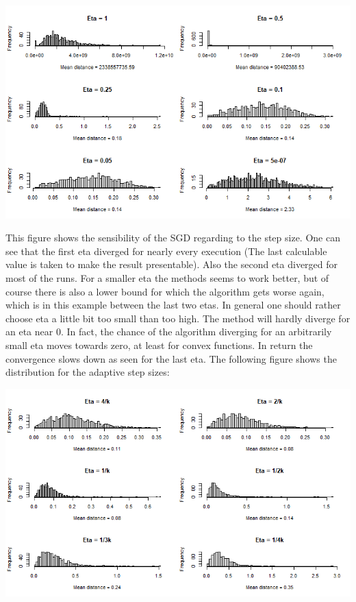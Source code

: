 \documentclass{article}
\begin{document}
\begin{center}
    \includegraphics[scale=0.57]{Constant Etas.png}
\end{center}


This figure shows the sensibility of the SGD regarding to the step size. One can see that the first eta diverged for nearly every execution (The last calculable value is taken to make the result presentable). Also the second eta diverged for most of the runs. For a smaller eta the methods seems to work better, but of course there is also a lower bound for which the algorithm gets worse again, which is in this example between the last two etas. In general one should rather choose eta a little bit too small than too high. The method will hardly diverge for an eta near 0. In fact, the chance of the algorithm diverging for an arbitrarily small eta moves towards zero, at least for convex functions. In return the convergence slows down as seen for the last eta. The following figure shows the distribution for the adaptive step sizes: 

\begin{center}
    \includegraphics[scale=0.57]{Eta adaptive.png}
\end{center}
\end{document}

